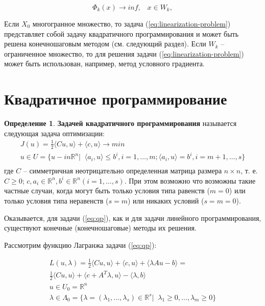 \documentclass[a4paper, 12pt, titlepage]{article}
\theoremstyle{definition}
\newtheorem{SmartDefinition}{Определение}
\theoremstyle{plain}
\theoremstyle{plain}
\begin{document}
\begin{equation}
 \label{eq:linearization-problem}
 \Phi_{k}(x) \to inf, \;\;\; x \in W_{k},
\end{equation}

Если $X_{0}$ многогранное множество, то задача (\ref{eq:linearization-problem})
представляет собой задачу квадратичного программирования и может быть решена
конечношаговым методом (см. следующий раздел). Если $W_{k}$ -- ограниченное
множество, то для решения задачи (\ref{eq:linearization-problem}) может быть
использован, например, метод условного градиента.

\section{Квадратичное программирование}

\begin{SmartDefinition}
 \textbf{Задачей квадратичного программирования} называется следующая задача
 оптимизации:
 \begin{equation}
  \begin{aligned}
  \label{eq:qp}
  J(u) = \frac{1}{2} \langle C u, u \rangle + \langle c, u \rangle \to min \\
  u \in U = \{u -in \mathbb{R}^{n} | \;\; \langle a_{i}, u \rangle \leq b^{i},
  i = 1, \ldots, m; \langle a_{i}, u \rangle = b^{i}, i = m + 1, \ldots, s\} \\
  \end{aligned}
 \end{equation}
 где $C$ -- симметричная неотрицательно определенная матрица размера
 $n \times n$, т. е.
 $C \geq 0$; $c, a_{i} \in \mathbb{R}^{n}, b^{i} \in \mathbb{R}^{n} (i = 1, 
 \ldots, s)$. При этом возможно что возможны такие частные случаи, когда могут
 быть только условия типа равенств ($m = 0$) или только условия типа неравенств
 ($s = m$) или никаких условий ($s = m = 0$).
\end{SmartDefinition}

Оказывается, для задачи (\ref{eq:qp}), как и для задачи линейного
программирования, существуют конечные (конечношаговые) методы их решения.

Рассмотрим функцию Лагранжа задачи (\ref{eq:qp}):

\begin{equation}
 \begin{aligned}
 L(u, \lambda) = \frac{1}{2} \langle C u, u \rangle + \langle c, u \rangle +
 \langle \lambda A u - b \rangle = \\
 \frac{1}{2} \langle C u, u \rangle +
 \langle c + A^{T} \lambda, u \rangle - \langle \lambda, b \rangle \\
 u \in U_{0} = \mathbb{R}^{n} \\
 \lambda \in \Lambda_{0} = \{\lambda = (\lambda_{1}, \ldots, \lambda_{s})
 \in \mathbb{R}^{s} | \;\; \lambda_{1} \geq 0, \ldots, \lambda_{m} \geq 0 \}
 \end{aligned}
\end{equation}
\end{document}
